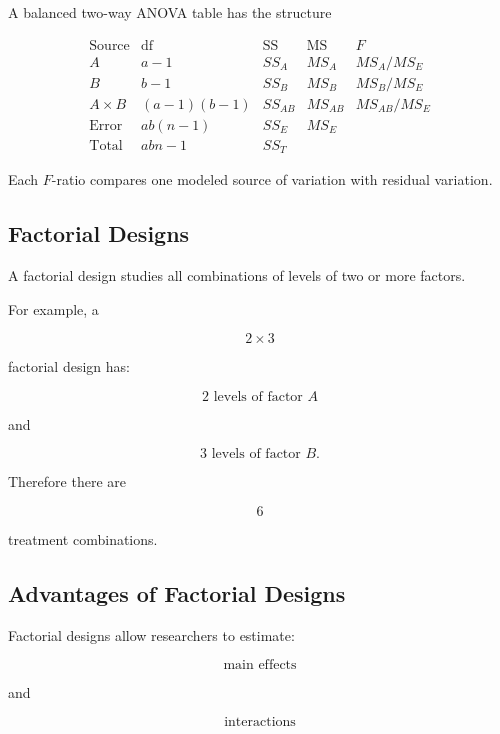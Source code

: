 A balanced two-way ANOVA table has the structure

\[
\begin{array}{c|c|c|c|c}
\text{Source}
&
\text{df}
&
\text{SS}
&
\text{MS}
&
F
\\
\hline
A
&
a-1
&
SS_A
&
MS_A
&
MS_A/MS_E
\\
B
&
b-1
&
SS_B
&
MS_B
&
MS_B/MS_E
\\
A\times B
&
(a-1)(b-1)
&
SS_{AB}
&
MS_{AB}
&
MS_{AB}/MS_E
\\
\text{Error}
&
ab(n-1)
&
SS_E
&
MS_E
&
\\
\text{Total}
&
abn-1
&
SS_T
&
&
\end{array}
\]

Each \(F\)-ratio compares one modeled source of variation with residual
variation.

\subsection{Factorial Designs}
\label{subsec:factorial-designs-anova}

A factorial design studies all combinations of levels of two or more
factors.

For example, a

\[
2\times3
\]

factorial design has:

\[
\boxed{
2
\text{ levels of factor }A
}
\]

and

\[
\boxed{
3
\text{ levels of factor }B.
}
\]

Therefore there are

\[
\boxed{
6
}
\]

treatment combinations.

\subsection{Advantages of Factorial Designs}
\label{subsec:factorial-design-advantages}

Factorial designs allow researchers to estimate:

\[
\boxed{
\text{main effects}
}
\]

and

\[
\boxed{
\text{interactions}
}
\]

